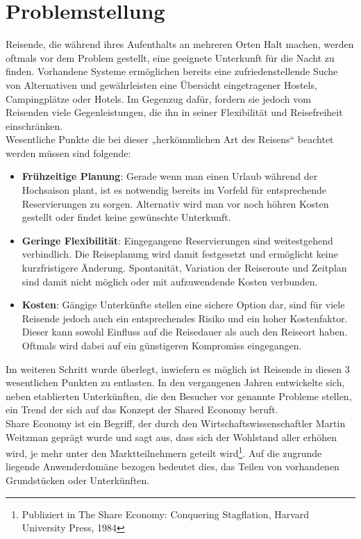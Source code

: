 
\section{Problemstellung}
Reisende, die während ihres Aufenthalts an mehreren Orten Halt machen, werden oftmals vor dem Problem gestellt, eine geeignete Unterkunft für die Nacht zu finden. Vorhandene Systeme ermöglichen bereits eine zufriedenstellende Suche von Alternativen und gewährleisten eine Übersicht eingetragener Hostels, Campingplätze oder Hotels. Im Gegenzug dafür, fordern sie jedoch vom Reisenden viele Gegenleistungen, die ihn in seiner Flexibilität und Reisefreiheit einschränken.\\
Wesentliche Punkte die bei dieser „herkömmlichen Art des Reisens“ beachtet werden müssen sind folgende:
\begin{itemize}
   \item \textbf{Frühzeitige Planung}: Gerade wenn man einen Urlaub während der Hochsaison plant, ist es notwendig bereits im Vorfeld für entsprechende Reservierungen zu sorgen. Alternativ wird man vor noch höhren Kosten gestellt oder findet keine gewünschte Unterkunft. 
   \item \textbf{Geringe Flexibilität}: Eingegangene Reservierungen sind weitestgehend verbindlich. Die Reiseplanung wird damit festgesetzt und ermöglicht keine kurzfristigere Änderung. Spontanität, Variation der Reiseroute und Zeitplan sind damit nicht möglich oder mit aufzuwendende Kosten verbunden.
   \item \textbf{Kosten}: Gängige Unterkünfte stellen eine sichere Option dar, sind für viele Reisende jedoch auch ein entsprechendes Risiko und ein hoher Kostenfaktor. Dieser kann sowohl Einfluss auf die Reisedauer als auch den Reiseort haben. Oftmals wird dabei auf ein günstigeren Kompromiss eingegangen. 

\end{itemize}

Im weiteren Schritt wurde überlegt, inwiefern es möglich ist  Reisende in diesen 3 wesentlichen Punkten zu entlasten.
In den vergangenen Jahren entwickelte sich, neben etablierten Unterkünften, die den Besucher vor genannte Probleme stellen, ein Trend der sich auf das Konzept der Shared Economy beruft.\\
Share Economy ist ein Begriff, der durch den Wirtschaftswissenschaftler Martin Weitzman geprägt wurde und sagt aus, dass sich der Wohlstand aller erhöhen wird, je mehr unter den Marktteilnehmern geteilt wird\footnote{Publiziert in The Share Economy: Conquering Stagflation, Harvard University Press, 1984}. Auf die zugrunde liegende Anwenderdomäne bezogen bedeutet dies, das Teilen von vorhandenen Grundstücken oder Unterkünften.  

